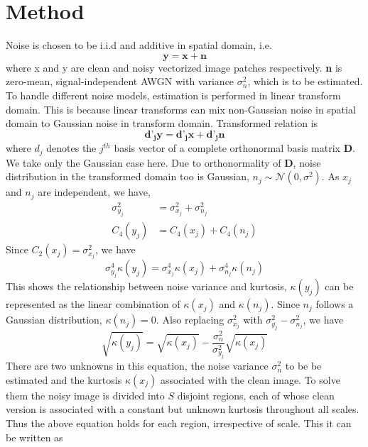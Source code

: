 \documentclass[11pt]{article}
\begin{document}
\section{Method}
Noise is chosen to be i.i.d and additive in spatial domain, i.e.
\begin{equation}
\mathbf{y  = x + n}
\end{equation}
where x and y are clean and noisy vectorized image patches respectively. \textbf{n} is zero-mean, signal-independent AWGN with variance $\sigma^2_n$, which is to be estimated. To handle different noise models, estimation is performed in linear transform domain. This is because linear transforms can mix non-Gaussian noise in spatial domain to Gaussian noise in transform domain. Transformed relation is
\begin{equation}
\mathbf{d’_jy = d’_jx + d’_jn}
\end{equation}
where $d_j$ denotes the $j^{th}$ basis vector of a complete orthonormal basis matrix \textbf{D}. We take only the Gaussian case here. Due to orthonormality of \textbf{D}, noise distribution in the transformed domain too is Gaussian, $n_j \sim \mathcal{N}(0,\sigma^2)$. As $x_j$ and $n_j$ are independent, we have,
$$\begin{aligned} \sigma _ { y _ { j } } ^ { 2 } & = \sigma _ { x _ { j } } ^ { 2 } + \sigma _ { n _ { j } } ^ { 2 } \\ 
C _ { 4 } \left( y _ { j } \right) & = C _ { 4 } \left( x _ { j } \right) + C _ { 4 } \left( n _ { j } \right)\end{aligned}$$
Since $C_2(x_j) = \sigma^2_{x_j} $, we have
$$\sigma _ { y _ { j } } ^ { 4 } \kappa \left( y _ { j } \right) = \sigma _ { x _ { j } } ^ { 4 } \kappa \left( x _ { j } \right) + \sigma _ { n _ { j } } ^ { 4 } \kappa \left( n _ { j } \right)$$
This shows the relationship between noise variance and kurtosis, $\kappa(y_j)$ can be represented as the linear combination of $\kappa(x_j)$ and $\kappa(n_j)$. Since $n_j$ follows a Gaussian distribution, $\kappa(n_j) = 0$.  Also replacing $\sigma _ { x _ { j } } ^ {2}$ with $\sigma _ { y _ { j } } ^ {2 }-\sigma _ { n _ { j } } ^ {2 }$, we have
$$\sqrt { \kappa \left( y _ { j } \right) } = \sqrt { \kappa \left( x _ { j } \right) } - \frac { \sigma _ { n } ^ { 2 } } { \sigma _ { y _ { j } } ^ { 2 } } \sqrt { \kappa \left( x _ { j } \right) }$$
There are two unknowns in this equation, the noise variance $\sigma_n^2$ to be be estimated and the kurtosis $\kappa(x_j)$ associated with the clean image.  To solve them the noisy image is divided into $S$ disjoint regions, each of whose clean version is associated with a constant but unknown kurtosis throughout all scales. Thus the above equation holds for each region, irrespective of scale. This it can be written as
\end{document}
